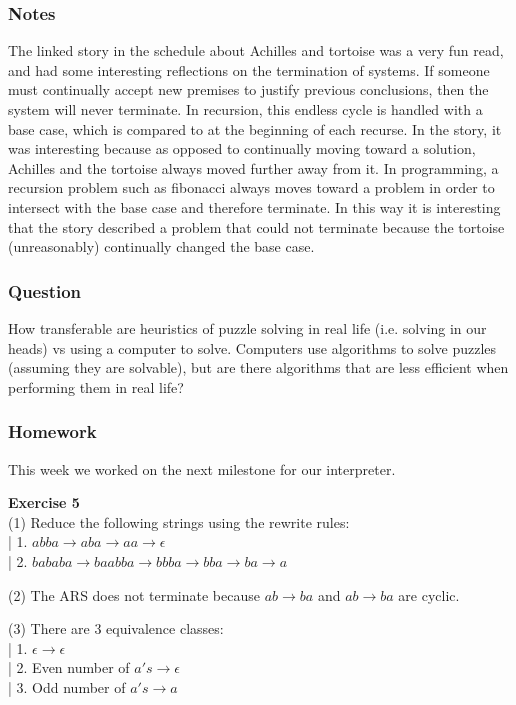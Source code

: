 \documentclass{article}
\theoremstyle{theorem}
\theoremstyle{definition}
\theoremstyle{remark}
\begin{document}
\subsubsection*{Notes} The linked story in the schedule about Achilles and tortoise was a very fun read, and had some interesting reflections on the termination of systems. If someone must continually accept new premises to justify previous conclusions, then the system will never terminate. In recursion, this endless cycle is handled with a base case, which is compared to at the beginning of each recurse. In the story, it was interesting because as opposed to continually moving toward a solution, Achilles and the tortoise always moved further away from it. In programming, a recursion problem such as fibonacci always moves toward a problem in order to intersect with the base case and therefore terminate. In this way it is interesting that the story described a problem that could not terminate because the tortoise (unreasonably) continually changed the base case.

\subsubsection*{Question} How transferable are heuristics of puzzle solving in real life (i.e. solving in our heads) vs using a computer to solve. Computers use algorithms to solve puzzles (assuming they are solvable), but are there algorithms that are less efficient when performing them in real life?

\subsubsection*{Homework} This week we worked on the next milestone for our interpreter.

\textbf{Exercise 5}\\

(1) Reduce the following strings using the rewrite rules:\\
|    1. $abba \rightarrow aba \rightarrow aa \rightarrow \epsilon$\\
|    2. $bababa \rightarrow baabba \rightarrow bbba \rightarrow bba \rightarrow ba \rightarrow a$

(2) The ARS does not terminate because $ab \rightarrow ba$ and $ab \rightarrow ba$ are cyclic.

(3) There are 3 equivalence classes:\\
|    1. $\epsilon \rightarrow \epsilon$\\
|    2. Even number of $a's \rightarrow \epsilon$\\
|    3. Odd number of $a's \rightarrow a$\\
\end{document}
